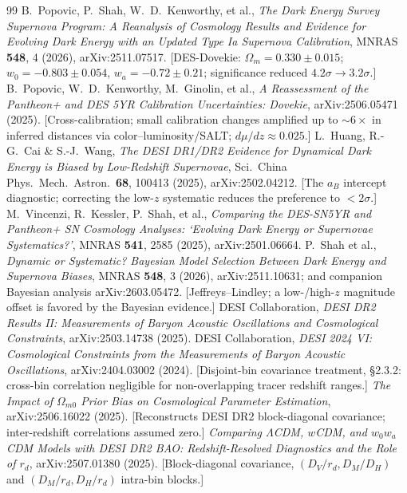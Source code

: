 \documentclass[11pt]{article}
\newcommand{\LCDM}{$\Lambda$CDM}
\newcommand{\Om}{\ensuremath{\Omega_m}}
\newcommand{\wo}{\ensuremath{w_0}}
\newcommand{\wa}{\ensuremath{w_a}}
\newcommand{\Dmrd}{\ensuremath{D_M/r_d}}
\newcommand{\Dhrd}{\ensuremath{D_H/r_d}}
\newcommand{\Dvrd}{\ensuremath{D_V/r_d}}
\begin{document}
\begin{thebibliography}{99}
\small
{} B.~Popovic, P.~Shah, W.~D.~Kenworthy, et al., \emph{The Dark Energy Survey Supernova Program: A Reanalysis of Cosmology Results and Evidence for Evolving Dark Energy with an Updated Type Ia Supernova Calibration}, MNRAS \textbf{548}, 4 (2026), arXiv:2511.07517. [DES-Dovekie: $\Om=0.330\pm0.015$; $\wo=-0.803\pm0.054$, $\wa=-0.72\pm0.21$; significance reduced $4.2\sigma\to3.2\sigma$.]
 B.~Popovic, W.~D.~Kenworthy, M.~Ginolin, et al., \emph{A Reassessment of the Pantheon+ and DES 5YR Calibration Uncertainties: Dovekie}, arXiv:2506.05471 (2025). [Cross-calibration; small calibration changes amplified up to $\sim\!6\times$ in inferred distances via color--luminosity/SALT; $d\mu/dz\approx0.025$.]
 L.~Huang, R.-G.~Cai \& S.-J.~Wang, \emph{The DESI DR1/DR2 Evidence for Dynamical Dark Energy is Biased by Low-Redshift Supernovae}, Sci.\ China Phys.\ Mech.\ Astron.\ \textbf{68}, 100413 (2025), arXiv:2502.04212. [The $a_B$ intercept diagnostic; correcting the low-$z$ systematic reduces the preference to $<2\sigma$.]
 M.~Vincenzi, R.~Kessler, P.~Shah, et al., \emph{Comparing the DES-SN5YR and Pantheon+ SN Cosmology Analyses: `Evolving Dark Energy or Supernovae Systematics?'}, MNRAS \textbf{541}, 2585 (2025), arXiv:2501.06664.
 P.~Shah et al., \emph{Dynamic or Systematic? Bayesian Model Selection Between Dark Energy and Supernova Biases}, MNRAS \textbf{548}, 3 (2026), arXiv:2511.10631; and companion Bayesian analysis arXiv:2603.05472. [Jeffreys--Lindley; a low-/high-$z$ magnitude offset is favored by the Bayesian evidence.]
 DESI Collaboration, \emph{DESI DR2 Results II: Measurements of Baryon Acoustic Oscillations and Cosmological Constraints}, arXiv:2503.14738 (2025).
 DESI Collaboration, \emph{DESI 2024 VI: Cosmological Constraints from the Measurements of Baryon Acoustic Oscillations}, arXiv:2404.03002 (2024). [Disjoint-bin covariance treatment, \S2.3.2: cross-bin correlation negligible for non-overlapping tracer redshift ranges.]
 \emph{The Impact of $\Omega_{m0}$ Prior Bias on Cosmological Parameter Estimation}, arXiv:2506.16022 (2025). [Reconstructs DESI DR2 block-diagonal covariance; inter-redshift correlations assumed zero.]
 \emph{Comparing \LCDM, $w$CDM, and $w_0w_a$CDM Models with DESI DR2 BAO: Redshift-Resolved Diagnostics and the Role of $r_d$}, arXiv:2507.01380 (2025). [Block-diagonal covariance, $(\Dvrd, D_M/D_H)$ and $(\Dmrd,\Dhrd)$ intra-bin blocks.]

\end{thebibliography}
\end{document}
